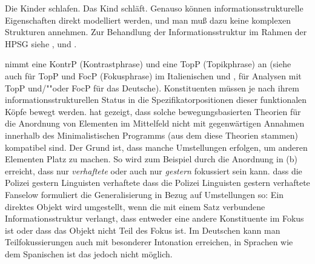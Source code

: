 \eal
\ex Die Kinder schlafen.
\ex Das Kind schläft.
\zl
Genauso können informationsstrukturelle Eigenschaften direkt modelliert
werden, und man muß dazu keine komplexen Strukturen annehmen. Zur Behandlung der
Informationsstruktur im Rahmen der HPSG siehe ,  und
.%



\mbox{}\citet{Frey2004a} nimmt eine KontrP (Kontrastphrase) und 
\citet{Frey2004b-u}
eine TopP (Topikphrase) an (siehe auch  für TopP und FocP (Fokusphrase) im Italienischen und 
,  für Analysen mit TopP und/""oder FocP für das Deutsche).
Konstituenten müssen je nach ihrem informationsstrukturellen Status in die Spezifikatorpositionen
dieser funktionalen Köpfe bewegt werden. \citet{Fanselow2003b} hat gezeigt, dass solche bewegungsbasierten
Theorien für die Anordnung von Elementen im Mittelfeld nicht mit gegenwärtigen Annahmen innerhalb
des Minimalistischen Programms (aus dem diese Theorien stammen) kompatibel sind. Der Grund ist,
dass manche Umstellungen erfolgen, um anderen Elementen Platz zu machen. So wird zum Beispiel
durch die Anordnung in (b) erreicht, dass nur \emph{verhaftete} oder auch nur \emph{gestern}
fokussiert sein kann.
\eal
\ex dass die Polizei gestern Linguisten verhaftete
\ex dass die Polizei Linguisten gestern verhaftete
\zl
Fanselow formuliert die Generalisierung in Bezug auf Umstellungen so: Ein direktes Objekt wird
umgestellt, wenn die mit einem Satz verbundene Informationsstruktur verlangt, dass entweder
eine andere Konstituente im Fokus ist oder dass das Objekt nicht Teil des Fokus ist. Im Deutschen
kann man Teilfokussierungen auch mit besonderer Intonation erreichen, in Sprachen wie dem Spanischen
ist das jedoch nicht möglich.

